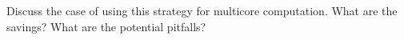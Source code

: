   Discuss the case of using this strategy for multicore computation.
  What are the savings? What are the potential pitfalls?
